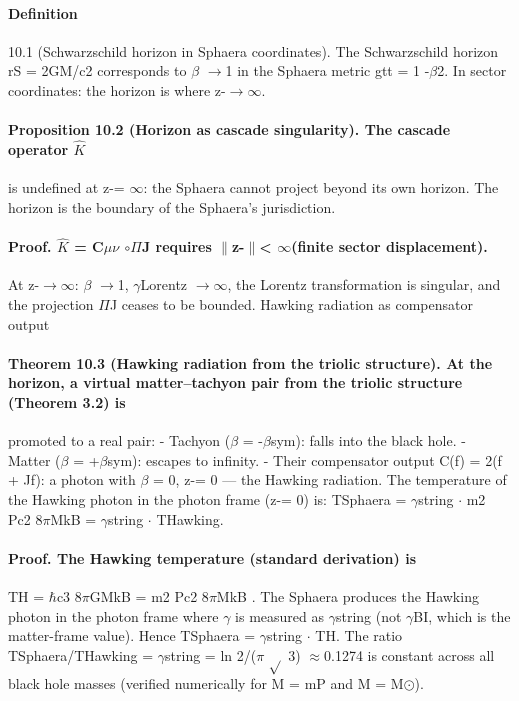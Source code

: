 \paragraph*{Definition}
10.1
(Schwarzschild horizon in Sphaera coordinates). The Schwarzschild horizon rS = 2GM/c2 corresponds to $\beta$ $\to$1 in the Sphaera metric gtt = 1 -$\beta$2. In sector coordinates: the horizon is where z-$\to$$\infty$.
\paragraph*{Proposition 10.2 (Horizon as cascade singularity). The cascade operator $\hat K$}
is undefined at z-= $\infty$: the Sphaera cannot project beyond its own horizon. The horizon is the boundary of the Sphaera's jurisdiction.
\paragraph*{Proof. $\hat K$ = C$\mu$$\nu$ $\circ$$\Pi$J requires $\|$z-$\|$< $\infty$(finite sector displacement).}
At z-$\to$$\infty$: $\beta$ $\to$1, $\gamma$Lorentz $\to$$\infty$, the Lorentz transformation is singular, and the projection $\Pi$J ceases to be bounded. Hawking radiation as compensator output
\paragraph*{Theorem 10.3 (Hawking radiation from the triolic structure). At the horizon, a virtual matter--tachyon pair from the triolic structure (Theorem 3.2) is}
promoted to a real pair:
- Tachyon ($\beta$ = -$\beta$sym): falls into the black hole.
- Matter ($\beta$ = +$\beta$sym): escapes to infinity.
- Their compensator output C(f) =
2(f + Jf): a photon with $\beta$ = 0, z-= 0 --- the Hawking radiation. The temperature of the Hawking photon in the photon frame (z-= 0) is: TSphaera = $\gamma$string $\cdot$ m2 Pc2 8$\pi$MkB = $\gamma$string $\cdot$ THawking.
\paragraph*{Proof. The Hawking temperature (standard derivation) is}
TH = $\hbar$c3 8$\pi$GMkB = m2 Pc2 8$\pi$MkB . The Sphaera produces the Hawking photon in the photon frame where $\gamma$ is measured as $\gamma$string (not $\gamma$BI, which is the matter-frame value). Hence TSphaera = $\gamma$string $\cdot$ TH. The ratio TSphaera/THawking = $\gamma$string = ln 2/($\pi$ $\sqrt{}$ 3) $\approx$0.1274 is constant across all black hole masses (verified numerically for M = mP and M = M$\odot$).
